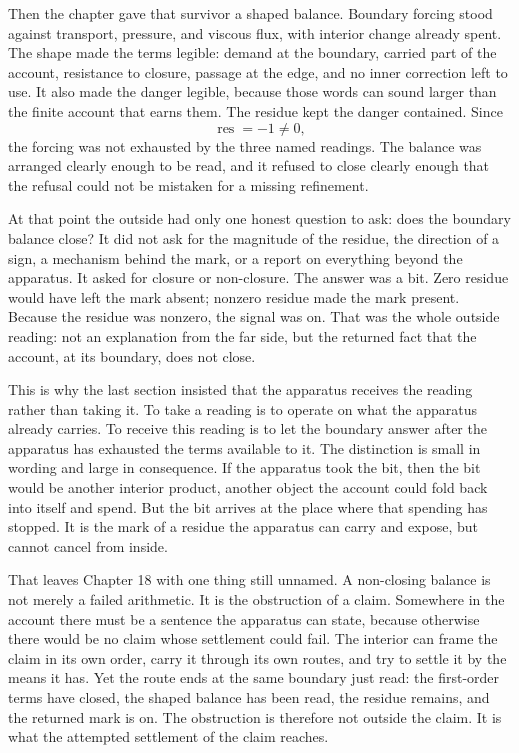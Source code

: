 Then the chapter gave that survivor a shaped balance. Boundary forcing stood against transport,
pressure, and viscous flux, with interior change already spent. The shape made the terms
legible: demand at the boundary, carried part of the account, resistance to closure, passage at
the edge, and no inner correction left to use. It also made the danger legible, because those
words can sound larger than the finite account that earns them. The residue kept the danger
contained. Since
\[
  \operatorname{res} = -1 \neq 0,
\]
the forcing was not exhausted by the three named readings. The balance was arranged clearly
enough to be read, and it refused to close clearly enough that the refusal could not be mistaken
for a missing refinement.

At that point the outside had only one honest question to ask: does the boundary balance close?
It did not ask for the magnitude of the residue, the direction of a sign, a mechanism behind the
mark, or a report on everything beyond the apparatus. It asked for closure or non-closure. The
answer was a bit. Zero residue would have left the mark absent; nonzero residue made the mark
present. Because the residue was nonzero, the signal was on. That was the whole outside reading:
not an explanation from the far side, but the returned fact that the account, at its boundary,
does not close.

This is why the last section insisted that the apparatus receives the reading rather than taking
it. To take a reading is to operate on what the apparatus already carries. To receive this
reading is to let the boundary answer after the apparatus has exhausted the terms available to
it. The distinction is small in wording and large in consequence. If the apparatus took the bit,
then the bit would be another interior product, another object the account could fold back into
itself and spend. But the bit arrives at the place where that spending has stopped. It is the
mark of a residue the apparatus can carry and expose, but cannot cancel from inside.

That leaves Chapter 18 with one thing still unnamed. A non-closing balance is not merely a
failed arithmetic. It is the obstruction of a claim. Somewhere in the account there must be a
sentence the apparatus can state, because otherwise there would be no claim whose settlement
could fail. The interior can frame the claim in its own order, carry it through its own routes,
and try to settle it by the means it has. Yet the route ends at the same boundary just read:
the first-order terms have closed, the shaped balance has been read, the residue remains, and
the returned mark is on. The obstruction is therefore not outside the claim. It is what the
attempted settlement of the claim reaches.

